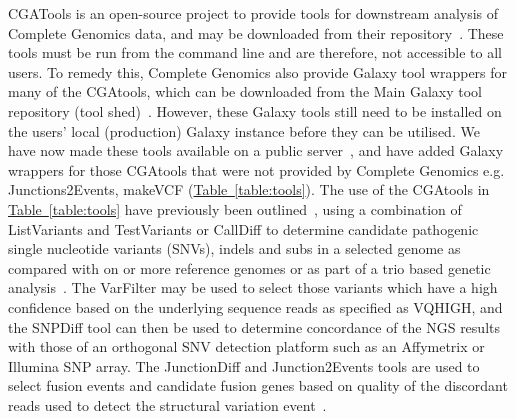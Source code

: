 CGATools is an open-source project to provide tools for downstream analysis of Complete Genomics data, and may be downloaded from their repository~\cite{url-cgatools}. These tools must be run from the command line and are therefore, not accessible to all users. To remedy this, Complete Genomics also provide Galaxy tool wrappers for many of the CGAtools, which can be downloaded from the Main Galaxy tool repository (tool shed)~\cite{url-toolshed}. However, these Galaxy tools still need to be installed on the users’ local (production) Galaxy instance before they can be utilised. We have now made these tools available on a public server~\cite{url-nbicgalaxy}, and have added Galaxy wrappers for those CGAtools that were not provided by Complete Genomics e.g. Junctions2Events, makeVCF (\hyperref[table:tools]{Table~\ref{table:tools}}). The use of the CGAtools in \hyperref[table:tools]{Table~\ref{table:tools}} have previously been outlined~\cite{nieminen}, using a combination of ListVariants and TestVariants or CallDiff to determine candidate pathogenic single nucleotide variants (SNVs), indels and subs in a selected genome as compared with on or more reference genomes or as part of a trio based genetic analysis~\cite{nieminen}. The VarFilter may be used to select those variants which have a high confidence based on the underlying sequence reads as specified as VQHIGH, and the SNPDiff tool can then be used to determine concordance of the NGS results with those of an orthogonal SNV detection platform such as an Affymetrix or Illumina SNP array. The JunctionDiff and Junction2Events tools are used to select fusion events and candidate fusion genes based on quality of the discordant reads used to detect the structural variation event~\cite{ifuse}.


